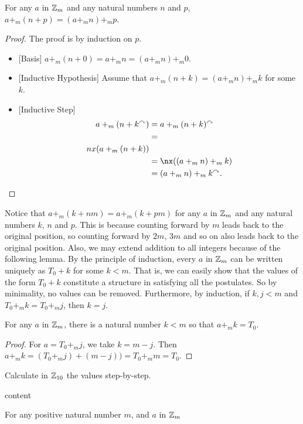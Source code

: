 \begin{lem}
	For any $a$ in ${\mathbb Z}_m$ and any natural numbers $n$ and $p$, $a +_m (n+p) = (a +_m n) +_m p$.
	
	\begin{proof}
		The proof is by induction on $p$. 
		\begin{itemize}
			\item{}[Basis] $a +_m (n+0) = a +_m n = (a +_m n) +_m 0$.
			\item{}[Inductive Hypothesis] Assume that $a +_m (n+k) = (a +_m n) +_m k$ for some $k$.
			\item{}[Inductive Step] 
			\begin{align*}
				a +_m (n+k^\nxt) &= a +_m (n+k)^\nxt\\ 
				                 &= \\nx(a +_m (n+k))\\
				                 &= \nx((a +_m n) +_m k)\\
				                 &= (a +_m n) +_m k^\nxt.
			\end{align*}
		\end{itemize}
	\end{proof}
\end{lem}

Notice that $a +_m (k + nm)= a +_m (k+pm)$ for any $a$ in ${\mathbb Z}_m$ and any natural numbers $k$, $n$ and $p$. 
This is because counting forward by $m$  leads back to the original position, so counting forward by $2m$, $3m$ and so on also leads back to the original position. 
Also, we may extend addition to all integers because of the following lemma.
By the principle of induction, every $a$ in ${\mathbb Z}_m$ can be written uniquely as $T_0 + k$ for some $k<m$.
That is, we can easily show that the values of the form $T_0 + k$ constitute a structure in satisfying all the postulates. So by minimality, no values can be removed. Furthermore, by induction, if $k,j<m$ and $T_0 +_m k = T_0 +_m j$, then $k=j$. 

\begin{lem}
	For any $a$ in ${\mathbb Z}_m$, there is a natural number $k<m$ so that $a +_m k = T_0$. 	
	\begin{proof}
		For $a = T_0 +_m j$, we take $k = m-j$. Then $a +_m k = (T_0 +_m j) + (m-j)) = T_0 +_m m = T_0$.
	\end{proof}
\end{lem}

\begin{exer}
	\begin{exercise}
		\item Calculate in $\ZZ_{10}$ the values step-by-step.
		\begin{enumerate}
			\item $T_4 + 4$
			\item $T_8+3$
			\item $T_2\times 
		\end{enumerate}
	\end{exercise}
	content
\end{exer}



\begin{lem}
	For any positive natural number $m$, and $a$ in ${\mathbb Z}_m$ 
\end{lem}
